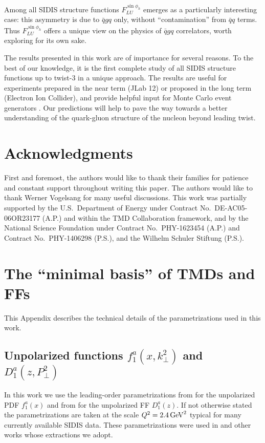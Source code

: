 \documentclass[a4paper,11pt]{article}
\begin{document}
Among all SIDIS structure functions $F_{LU}^{\sin\phi_h}$ emerges as
a particularly interesting case: this asymmetry is due to $\bar{q}gq$
only, without ``contamination'' from $\bar{q}q$ terms.
Thus $F_{LU}^{\sin\phi_h}$ offers a unique view on the physics of $\bar{q}gq$ 
correlators, worth exploring for its own sake.

The results presented in this work are of importance for several reasons.
To the best of our knowledge, it is the first complete study of all SIDIS 
structure functions up to twist-3 in a unique approach. The results are 
useful for experiments prepared in the near term (JLab 12) or proposed 
in the long term (Electron Ion Collider), and provide helpful input for 
Monte Carlo event generators \cite{Avakian:2015vha}.
Our predictions will help to pave the way
towards a better understanding of the quark-gluon structure
of the nucleon beyond leading twist.



\section{Acknowledgments}
First and foremost, the authors would like to thank their families 
for patience and constant support throughout writing this paper. 
The authors would like to thank Werner Vogelsang for many useful 
discussions. This work was partially supported by the U.S.\ 
Department of Energy under Contract No.~DE-AC05-06OR23177 (A.P.) 
and within the TMD Collaboration framework, and by the National 
Science Foundation under Contract No.\ PHY-1623454 (A.P.) and 
Contract No.\ PHY-1406298 (P.S.), and the Wilhelm Schuler Stiftung (P.S.).


 

\appendix

\section{\boldmath The ``minimal basis'' of TMDs and FFs}
\label{App:basis}

This Appendix describes the technical details of the parametrizations
used in this work.

\subsection{\boldmath Unpolarized functions $f_1^a(x,k_\perp^2)$ 
			and $D_1^a(z,P_\perp^2)$}
\label{App:basis-f1-D1}

In this work we use the leading-order parametrizations 
from \cite{Martin:2009iq} for the unpolarized PDF $f_1^a(x)$ and 
from \cite{deFlorian:2007aj} for the unpolarized FF $D_1^a(z)$.
If not otherwise stated the parametrizations are taken at the scale 
$Q^2=2.4\,{\rm GeV}^2$ typical for many currently available SIDIS data.
These parametrizations were used in \cite{Anselmino:2005nn} and other 
works whose extractions we adopt. 
\end{document}

